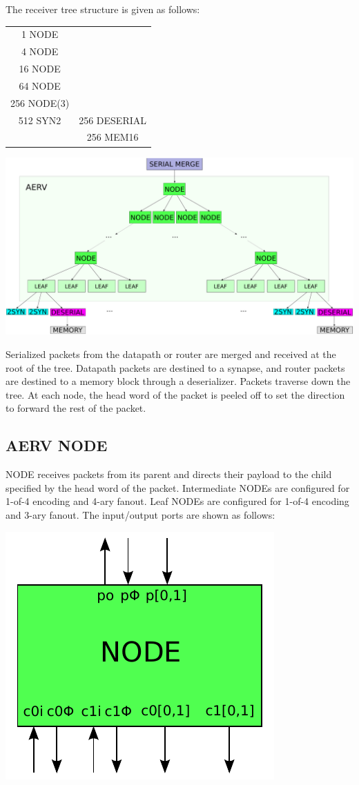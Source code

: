 \documentclass{article}
\begin{document}
\noindent
The receiver tree structure is given as follows:

\begin{center}
    \begin{tabular}{cc}
        1 NODE & \\
        4 NODE & \\
        16 NODE & \\
        64 NODE & \\
        256 NODE(3) & \\
        512 SYN2 & 256 DESERIAL \\
        & 256 MEM16 \\
    \end{tabular}
\end{center}

\begin{center}
  \includegraphics[width=.8\textwidth]{img/aerv.pdf}
\end{center}
Serialized packets from the datapath or router are merged and received at the
root of the tree.
Datapath packets are destined to a synapse, and router packets
are destined to a memory block through a deserializer. Packets
traverse down the tree. At each node, the head word of the packet is peeled
off to set the direction to forward the rest of the packet.

\subsection{AERV NODE \label{sec:AERV_NODE}}

NODE receives packets from its parent and directs their payload to the
child specified by the head word of the packet. Intermediate NODEs
are configured for 1-of-4 encoding and 4-ary fanout. Leaf NODEs are configured
for 1-of-4 encoding and 3-ary fanout.
The input/output ports are shown as follows:

\begin{center}
  \includegraphics[width=.25\textwidth]{img/aerv_node.pdf}
\end{center}
\end{document}
